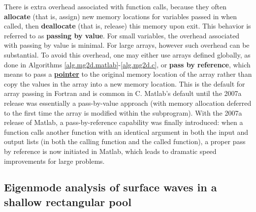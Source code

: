 \enlargethispage{10pt}

There is extra overhead associated with function calls, because they often
{\bf allocate} (that is, assign) new memory locations for variables passed in when called, then {\bf deallocate} (that is, release) this memory
upon exit.  This behavior is referred to as {\bf passing by value}.  For small variables, the overhead associated with passing by value is minimal.
For large arrays, however such overhead can be substantial.  To avoid this overhead, one may either use arrays defined globally,
as done in Algorithms \ref{alg.mg2d.matlab}-\ref{alg.mg2d.c}, or {\bf pass by reference}, which means to pass a \href{http://www.cs.stanford.edu/cslibrary/PointerFunCBig.avi}{\bf pointer}
to the original memory location of the array rather than copy the values in the array into a new memory location.
This is the default for array passing in Fortran and is common in C.  Matlab's default until the 2007a release was essentially a pass-by-value approach (with memory allocation deferred
to the first time the array is modified within the subprogram).  With the 2007a release of Matlab, a pass-by-reference capability was finally introduced:
when a function calls another function with an identical argument in both the input and output lists (in both the calling function and the called function),
a proper pass by reference is now initiated in Matlab, which leads to dramatic speed improvements for large problems.

\subsection{Eigenmode analysis of surface waves in a shallow rectangular pool}\label{sec.A.C.B.2d}
\enlargethispage{10pt}


